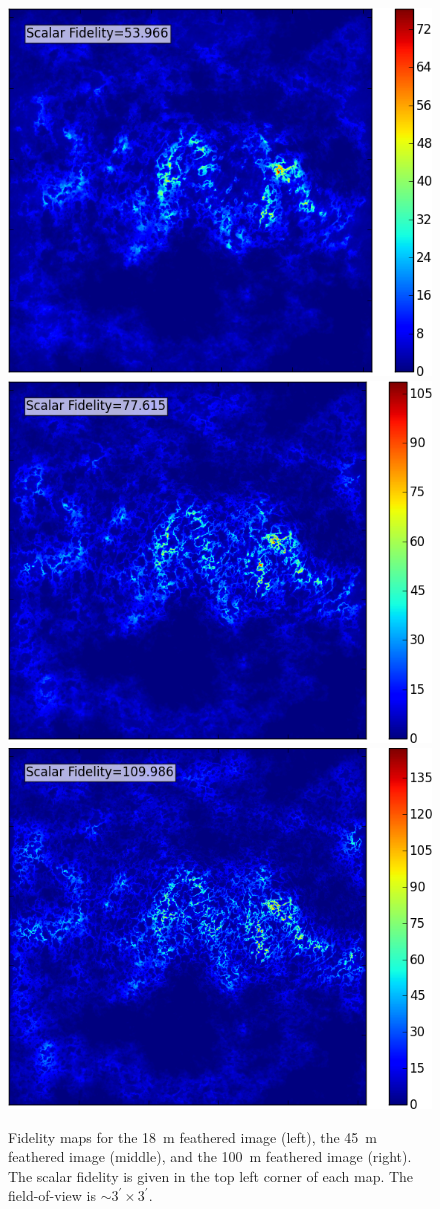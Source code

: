 \documentclass[12pt]{article}
\begin{document}
{\begin{figure}
\centering
\includegraphics[width=0.325\columnwidth]{figs54/feather18_fidelity.png} \includegraphics[width=0.325\columnwidth]{figs54/feather45_fidelity.png}
\includegraphics[width=0.325\columnwidth]{figs54/feather100_fidelity.png}
\caption{Fidelity maps for the \SI{18}{\meter} feathered image (left), the \SI{45}{\meter} feathered image (middle), and the \SI{100}{\meter} feathered image (right). The scalar fidelity is given in the top left corner of each map. The field-of-view is $\sim$$3^\prime \times 3^\prime$.}
\label{fig:fid}
\end{figure}


}
\end{document}
